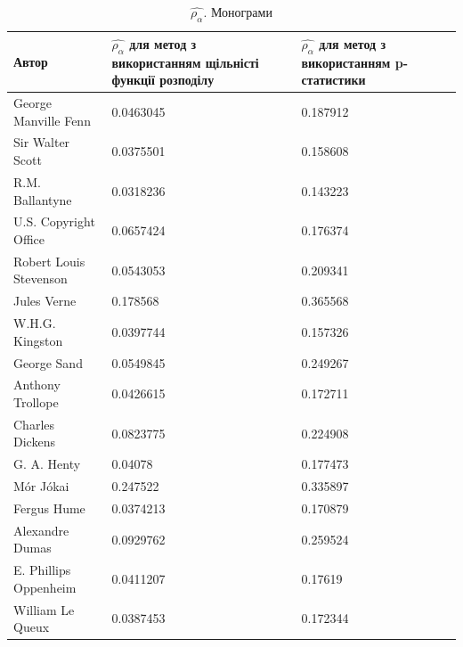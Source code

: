 \documentclass[12pt, a4paper]{extarticle}
\begin{document}
\begin{center}
\begin{table}
\begin{tabular}{|p{11em}|p{10em}|p{10em}|}
\hline
Автор & $\hat{\rho_\alpha}$ для метод з використанням щільністі функції розподілу & $\hat{\rho_\alpha}$ для метод з використанням p-статистики\\
\hline
George Manville Fenn & 0.0463045 & 0.187912\\
Sir Walter Scott & 0.0375501 & 0.158608 \\
R.M. Ballantyne & 0.0318236 & 0.143223\\
U.S. Copyright Office & 0.0657424 & 0.176374\\
Robert Louis Stevenson & 0.0543053 & 0.209341\\
Jules Verne & 0.178568 & 0.365568\\
W.H.G. Kingston & 0.0397744 & 0.157326\\
George Sand & 0.0549845 & 0.249267\\
Anthony Trollope & 0.0426615 & 0.172711\\
Charles Dickens & 0.0823775 & 0.224908\\
G. A. Henty & 0.04078 & 0.177473\\
Mór Jókai & 0.247522 & 0.335897\\
Fergus Hume & 0.0374213 & 0.170879\\
Alexandre Dumas & 0.0929762 & 0.259524\\
E. Phillips Oppenheim & 0.0411207 & 0.17619\\
William Le Queux & 0.0387453 & 0.172344\\
\hline
\end{tabular}
\caption{$\hat{\rho_\alpha}$. Монограми}
\label{tab:6}
\end{table}
\end{center}
\end{document}
